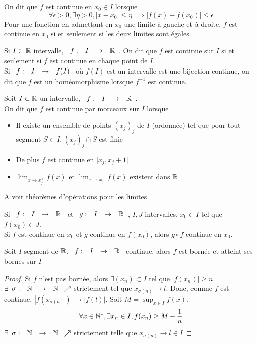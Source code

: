 \documentclass[]{report}
\begin{document}
\begin{df}
    On dit que $f$ est continue en $x_0\in I$ lorsque
    \[\forall \epsilon>0, \exists \eta >0, \left|x-x_0\right|\le \eta \implies \left|f(x) -f(x_0)\right|\le \epsilon\]
    Pour une fonction en admettant en $x_0$ une limite à gauche et à droite, $f$ est continue en $x_0$ si et seulement si les deux limites sont égales.
\end{df}

\begin{df}{}{}
    Si $I \subset \mathbb{R}$ intervalle, $\begin{array}{ccccc} f : & I & \to & \mathbb{R} \end{array}$. On dit que $f$ est continue sur $I$ si et seulement si $f$ est continue en chaque point de $I$.\\
    Si $\begin{array}{ccccc} f : & I & \to & f(I) \end{array}$ où $f(I)$ est un intervalle est une bijection continue, on dit que $f$ est un homéomorphisme lorsque $f^{-1}$ est continue.
\end{df}

\begin{df}{}{}
    Soit $I\subset \mathbb{R}$ un intervalle, $\begin{array}{ccccc} f : & I & \to & \mathbb{R} \end{array}$.\\
    On dit que $f$ est continue par morceaux sur $I$ lorsque 
    \begin{itemize}
        \item Il existe un ensemble de points $(x_j)_j$ de $I$ (ordonnée) tel que pour tout segment $S\subset I, (x_j)_j\cap S$ est finie
        \item De plus $f$ est continue en $]x_j,x_j+1[$
        \item $\lim_{x\to x_j^+} f(x)$ et $\lim_{x\to x_j^-} f(x)$ existent dans $\mathbb{R}$
    \end{itemize}
\end{df}

A voir théorèmes d'opérations pour les limites

\begin{ra}{}{}
    Si $\begin{array}{ccccc} f : & I & \to & \mathbb{R} \end{array}$ et $\begin{array}{ccccc} g : & I & \to & \mathbb{R} \end{array}$, $I,J$ intervalles, $x_0\in I$ tel que $f(x_0)\in J$.\\
    Si $f$ est continue en $x_0$ et $g$ continue en $f(x_0)$, alors $g\circ f$ continue en $x_0$.
\end{ra}

\begin{prop}{}{}
    Soit $I$ segment de $\mathbb{R}$, $\begin{array}{ccccc} f : & I & \to & \mathbb{R} \end{array}$ continue, alors $f$ est bornée et atteint ses bornes sur $I$
\end{prop}

\begin{proof}
    Si $f$ n'est pas bornée, alors $\exists(x_n) \subset I$ tel que $\left| f(x_n)\right|\ge n$.\\
    $\exists \begin{array}{ccccc} \sigma : & \mathbb{N} & \to & \mathbb{N} \end{array} \nearrow$ strictement tel que $x_{\sigma(n)}\to l$. Donc, comme $f$ est continue, $\left| f(x_{\sigma(n)})\right| \to \left| f(l)\right|$. Soit $M=\sup_{x\in I} f(x)$.
    \[\forall x\in \mathbb{N}^*,\exists x_n\in I, f(x_n)\ge M-\frac{1}{n}\]
    $\exists \begin{array}{ccccc} \sigma : & \mathbb{N} & \to & \mathbb{N} \end{array} \nearrow $ strictement telle que $x_{\sigma(n)}\to l \in I$
\end{proof}
\end{document}
